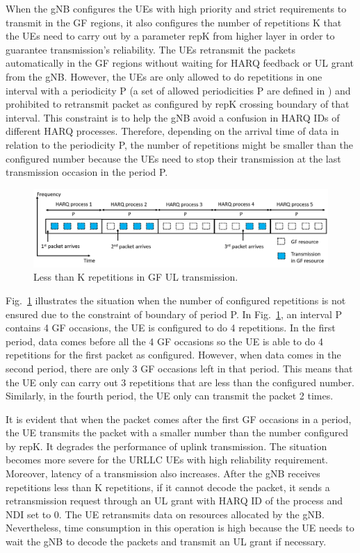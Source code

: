 \documentclass[conference]{IEEEtran}
\begin{document}
When the gNB configures the UEs with high priority and strict requirements to transmit in the GF regions, it also configures the number of repetitions K that the UEs need to carry out by a parameter repK from higher layer in order to guarantee transmission’s reliability. The UEs retransmit the packets automatically in the GF regions without waiting for HARQ feedback or UL grant from the gNB. However, the UEs are only allowed to do repetitions in one interval with a periodicity P (a set of allowed periodicities P are defined in \cite{ad5}) and prohibited to retransmit packet as configured by repK crossing boundary of that interval. This constraint is to help the gNB avoid a confusion in HARQ IDs of different HARQ processes. Therefore, depending on the arrival time of data in relation to the periodicity P, the number of repetitions might be smaller than the configured number because the UEs need to stop their transmission at the last transmission occasion in the period P.

\begin{figure}[htbp]
\centerline{\includegraphics[scale=0.27]{fig1.png}}
\caption{Less than K repetitions in GF UL transmission.}
\label{fig1}
\end{figure}

Fig.~\ref{fig1} illustrates the situation when the number of configured repetitions is not ensured due to the constraint of boundary of period P. In Fig.~\ref{fig1}, an interval P contains 4 GF occasions, the UE is configured to do 4 repetitions. In the first period, data comes before all the 4 GF occasions so the UE is able to do 4 repetitions for the first packet as configured. However, when data comes in the second period, there are only 3 GF occasions left in that period. This means that the UE only can carry out 3 repetitions that are less than the configured number. Similarly, in the fourth period, the UE only can transmit the packet 2 times.

It is evident that when the packet comes after the first GF occasions in a period, the UE transmits the packet with a smaller number than the number configured by repK. It degrades the performance of uplink transmission. The situation becomes more severe for the URLLC UEs with high reliability requirement. Moreover, latency of a transmission also increases. After the gNB receives repetitions less than K repetitions, if it cannot decode the packet, it sends a retransmission request through an UL grant with HARQ ID of the process and NDI set to 0. The UE retransmits data on resources allocated by the gNB. Nevertheless, time consumption in this operation is high because the UE needs to wait the gNB to decode the packets and transmit an UL grant if necessary.
\end{document}
